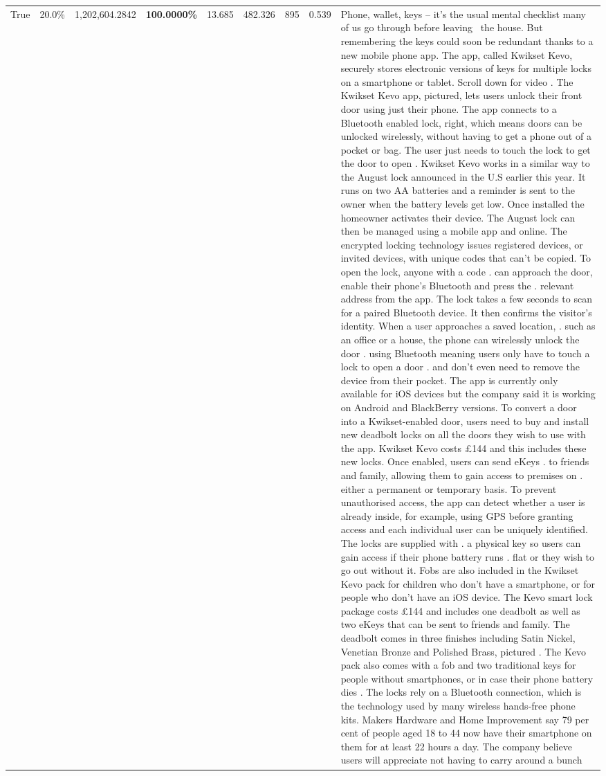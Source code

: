 \begin{table}[H]
\begin{tabular}{lllrlllll}
True & 20.0\% & 1,202,604.2842 & \bfseries \color{red} 100.0000\% & 13.685 & 482.326 & 895 & 0.539 & Phone, wallet, keys – it’s the usual mental checklist many of us go through before leaving  the house. But remembering the keys could soon be redundant thanks to a new mobile phone app. The app, called Kwikset Kevo, securely stores electronic versions of keys for multiple locks on a smartphone or tablet. Scroll down for video . The Kwikset Kevo app, pictured, lets users unlock their front door using just their phone. The app connects to a Bluetooth enabled lock, right, which means doors can be unlocked wirelessly, without having to get a phone out of a pocket or bag. The user just needs to touch the lock to get the door to open . Kwikset Kevo works in a similar way to the August lock announced in the U.S earlier this year. It runs on two AA batteries and a reminder is sent to the owner when the battery levels get low. Once installed the homeowner activates their device. The August lock can then be managed using a mobile app and online. The encrypted locking technology issues registered devices, or invited devices, with unique codes that can't be copied. To open the lock, anyone with a code . can approach the door, enable their phone's Bluetooth and press the . relevant address from the app. The lock takes a few seconds to scan for a paired Bluetooth device. It then confirms the visitor's identity. When a user approaches a saved location, . such as an office or a house, the phone can wirelessly unlock the door . using Bluetooth meaning users only have to touch a lock to open a door . and don't even need to remove the device from their pocket. The app is currently only available for iOS devices but the company said it is working on Android and BlackBerry versions. To convert a door into a Kwikset-enabled door, users need to buy and install new deadbolt locks on all the doors they wish to use with the app. Kwikset Kevo costs £144 and this includes these new locks. Once enabled, users can send eKeys . to friends and family, allowing them to gain access to premises on . either a permanent or temporary basis. To prevent unauthorised access, the app can detect whether a user is already inside, for example, using GPS before granting access and each individual user can be uniquely identified. The locks are supplied with . a physical key so users can gain access if their phone battery runs . flat or they wish to go out without it. Fobs are also included in the Kwikset Kevo pack for children who don't have a smartphone, or for people who don't have an iOS device. The Kevo smart lock package costs £144 and includes one deadbolt as well as two eKeys that can be sent to friends and family. The deadbolt comes in three finishes including Satin Nickel, Venetian Bronze and Polished Brass, pictured . The Kevo pack also comes with a fob and two traditional keys for people without smartphones, or in case their phone battery dies . The locks rely on a Bluetooth connection, which is the technology used by many wireless hands-free phone kits. Makers Hardware and Home Improvement say 79 per cent of people aged 18 to 44 now have their smartphone on them for at least 22 hours a day. The company believe users will appreciate not having to carry around a bunch 
\end{tabular}
\end{table}
